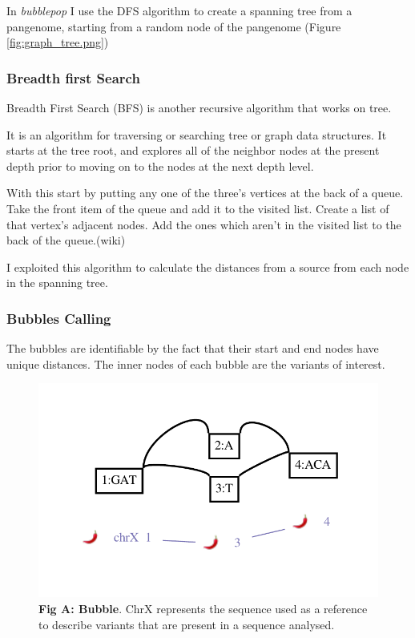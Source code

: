 In \textit{bubblepop} I use the DFS algorithm to create a spanning tree from a pangenome, starting from a random node of the pangenome (Figure \ref{fig:graph_tree.png}) %


\subsubsection{Breadth first Search}
Breadth First Search (BFS) is another recursive algorithm that works on tree.

It is an algorithm for traversing or searching tree or graph data structures. It starts at the tree root, and explores all of the neighbor nodes at the present depth prior to moving on to the nodes at the next depth level.


With this start by putting any one of the three's vertices at the back of a queue.
Take the front item of the queue and add it to the visited list.
Create a list of that vertex's adjacent nodes. Add the ones which aren't in the visited list to the back of the queue.(wiki)

I exploited this algorithm to calculate the distances from a source from each node in the spanning tree.


\subsubsection{Bubbles Calling}
The bubbles are identifiable by the fact that their start and end nodes have unique distances. The inner nodes of each bubble are the variants of interest. 

\begin{figure}[H]
\centering
\includegraphics[width=1.10\textwidth]{fig/GRaphchrX.pdf}
\decoRule
\caption{\textbf{Fig A: Bubble}. ChrX represents the sequence used as a reference to describe variants that are present in a sequence analysed.} %
\label{fig:bubble.png}
\end{figure}



